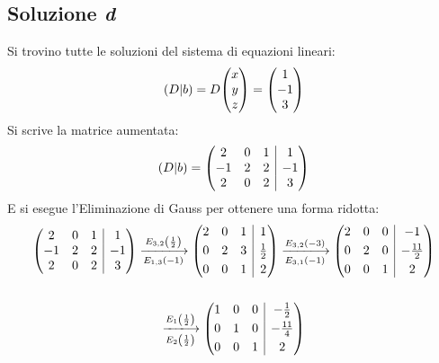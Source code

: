 \documentclass[a4paper]{article}
\makeatletter
\newenvironment{rowequmat}[1]{\left(\array{@{}#1@{}}}{\endarray\right)}
\makeatother
\begin{document}
	\subsection{Soluzione \emph{d}}
	
	Si trovino tutte le soluzioni del sistema di equazioni lineari:
	\begin{equation*}
		\left(D|b\right) = D\begin{rowequmat}{c}
			x \\
			y \\
			z
		\end{rowequmat} = \begin{rowequmat}{c}
			1 \\
			-1 \\
			3
		\end{rowequmat}
	\end{equation*}
	Si scrive la matrice aumentata:
	\begin{equation*}
		\left(D|b\right) = \begin{rowequmat}{ccc|c}
			2 & 0 & 1 & 1 \\
			-1 & 2 & 2 & -1 \\
			2 & 0 & 2 & 3
		\end{rowequmat}
	\end{equation*}
	E si esegue l'Eliminazione di Gauss per ottenere una forma ridotta:
	\begin{gather*}
		\begin{rowequmat}{ccc|c}
			2 & 0 & 1 & 1 \\
			-1 & 2 & 2 & -1 \\
			2 & 0 & 2 & 3
		\end{rowequmat} \xlongrightarrow[E_{1,3}\left(-1\right)]{E_{3,2}\left(\frac{1}{2}\right)}
		\begin{rowequmat}{ccc|c}
			2 & 0 & 1 & 1 \\ [0.3em]
			0 & 2 & 3 & \frac{1}{2} \\ [0.3em]
			0 & 0 & 1 & 2
		\end{rowequmat} \xlongrightarrow[E_{3,1}\left(-1\right)]{E_{3,2}\left(-3\right)}
		\begin{rowequmat}{ccc|c}
			2 & 0 & 0 & -1 \\ [0.3em]
			0 & 2 & 0 & -\frac{11}{2} \\ [0.3em]
			0 & 0 & 1 & 2
		\end{rowequmat} \\
		\\
		\xlongrightarrow[E_{2}\left(\frac{1}{2}\right)]{E_{1}\left(\frac{1}{2}\right)}
		\begin{rowequmat}{ccc|c}
			1 & 0 & 0 & -\frac{1}{2} \\ [0.3em]
			0 & 1 & 0 & -\frac{11}{4} \\ [0.3em]
			0 & 0 & 1 & 2
		\end{rowequmat}
	\end{gather*}
\end{document}

